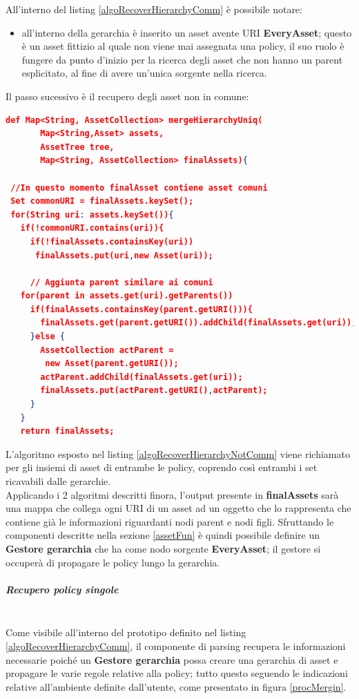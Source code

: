 \documentclass[12pt,a4paper,twoside]{book}
\begin{document}
All'interno del listing \ref{algoRecoverHierarchyComm} è possibile notare:
\begin{itemize}
	\item all'interno della gerarchia è inserito un asset avente URI \textbf{EveryAsset}; questo è un asset fittizio al quale non viene mai assegnata una policy, il suo ruolo è fungere da punto d'inizio per la ricerca degli asset che non hanno un parent esplicitato, al fine di avere un'unica sorgente nella ricerca.
\end{itemize}
Il passo sucessivo è il recupero degli asset non in comune:
\begin{lstlisting}[language=Json,firstnumber=1,caption={L'algoritmo ha prestazioni lineari in proporzione al numero di asset},label=algoRecoverHierarchyNotComm,captionpos=b]
def Map<String, AssetCollection> mergeHierarchyUniq(
       Map<String,Asset> assets,
       AssetTree tree,
       Map<String, AssetCollection> finalAssets){
       
 //In questo momento finalAsset contiene asset comuni      
 Set commonURI = finalAssets.keySet();  
 for(String uri: assets.keySet()){
   if(!commonURI.contains(uri)){
     if(!finalAssets.containsKey(uri))
      finalAssets.put(uri,new Asset(uri));
      
	 // Aggiunta parent similare ai comuni
   for(parent in assets.get(uri).getParents())
     if(finalAssets.containsKey(parent.getURI())){
       finalAssets.get(parent.getURI()).addChild(finalAssets.get(uri));
     }else {
       AssetCollection actParent =
        new Asset(parent.getURI());
       actParent.addChild(finalAssets.get(uri));
       finalAssets.put(actParent.getURI(),actParent);
     }
   }
   return finalAssets;
\end{lstlisting}
L'algoritmo esposto nel listing \ref{algoRecoverHierarchyNotComm} viene richiamato per gli insiemi di asset di entrambe le policy, coprendo così entrambi i set ricavabili dalle gerarchie.\\
Applicando i 2 algoritmi descritti finora, l'output presente in \textbf{finalAssets} sarà una mappa che collega ogni URI di un asset ad un oggetto che lo rappresenta che contiene già le informazioni riguardanti nodi parent e nodi figli. Sfruttando le componenti descritte nella sezione \ref{assetFun} è quindi possibile definire un \textbf{Gestore gerarchia} che ha come nodo sorgente \textbf{EveryAsset}; il gestore si occuperà di propagare le policy lungo la gerarchia.
\subparagraph{Recupero policy singole}\mbox{}\\
Come visibile all'interno del prototipo definito nel listing \ref{algoRecoverHierarchyComm}, il componente di parsing recupera le informazioni necessarie poiché un \textbf{Gestore gerarchia} possa creare una gerarchia di asset e propagare le varie regole relative alla policy; tutto questo seguendo le indicazioni relative all'ambiente definite dall'utente, come presentato in figura \ref{procMergin}.\\
\end{document}
